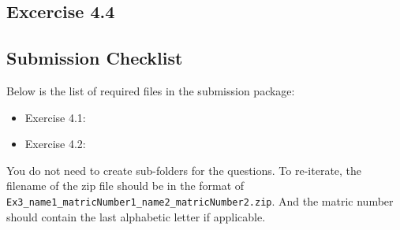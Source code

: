 \documentclass[12pt,a4paper,hidelinks,fleqn]{article}            %
\begin{document}
\subsection*{Excercise 4.4}


\subsection*{Submission Checklist}
Below is the list of required files in the submission package:
\begin{itemize}
\item Exercise 4.1: 
\item Exercise 4.2: 
\end{itemize}
You do not need to create sub-folders for the questions. 
To re-iterate, the filename of the zip file should be in the format of \verb=Ex3_name1_matricNumber1_name2_matricNumber2.zip=.
And the matric number should contain the last alphabetic letter if applicable. 
\end{document}
